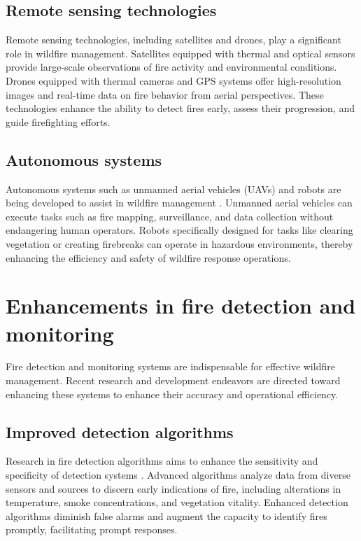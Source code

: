 \documentclass[
  12 pt,
]{Nemilov}
\begin{document}
\subsection{Remote sensing technologies}\label{remote-sensing-technologies}

Remote sensing technologies, including satellites and drones, play a significant role in wildfire management. Satellites equipped with thermal and optical sensors provide large-scale observations of fire activity and environmental conditions. Drones equipped with thermal cameras and GPS systems offer high-resolution images and real-time data on fire behavior from aerial perspectives. These technologies enhance the ability to detect fires early, assess their progression, and guide firefighting efforts.

\subsection{Autonomous systems}\label{autonomous-systems}

Autonomous systems such as unmanned aerial vehicles (UAVs) and robots are being developed to assist in wildfire management \citep{couceiro2019semfire, ferreira2020autonomous}. Unmanned aerial vehicles can execute tasks such as fire mapping, surveillance, and data collection without endangering human operators. Robots specifically designed for tasks like clearing vegetation or creating firebreaks can operate in hazardous environments, thereby enhancing the efficiency and safety of wildfire response operations.

\section{Enhancements in fire detection and monitoring}\label{enhancements-in-fire-detection-and-monitoring}

Fire detection and monitoring systems are indispensable for effective wildfire management. Recent research and development endeavors are directed toward enhancing these systems to enhance their accuracy and operational efficiency.

\subsection{Improved detection algorithms}\label{improved-detection-algorithms}

Research in fire detection algorithms aims to enhance the sensitivity and specificity of detection systems \citep{moayedi2023wildfire, pereira2022review}. Advanced algorithms analyze data from diverse sensors and sources to discern early indications of fire, including alterations in temperature, smoke concentrations, and vegetation vitality. Enhanced detection algorithms diminish false alarms and augment the capacity to identify fires promptly, facilitating prompt responses.
\end{document}
